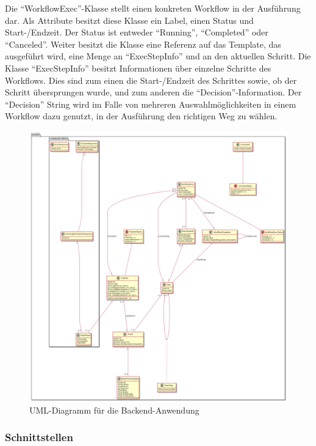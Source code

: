 Die \enquote{WorkflowExec}-Klasse stellt einen konkreten Workflow in der Ausführung dar.
Als Attribute besitzt diese Klasse ein Label, einen Status und Start-/Endzeit.
Der Status ist entweder \enquote{Running}, \enquote{Completed} oder \enquote{Canceled}.
Weiter besitzt die Klasse eine Referenz auf das Template, das ausgeführt wird, eine Menge an \enquote{ExecStepInfo} und an den aktuellen Schritt.
Die Klasse \enquote{ExecStepInfo} besitzt Informationen über einzelne Schritte des Workflows.
Dies sind zum einen die Start-/Endzeit des Schrittes sowie, ob der Schritt übersprungen wurde, und zum anderen die \enquote{Decision}-Information.
Der \enquote{Decision} String wird im Falle von mehreren Auswahlmöglichkeiten in einem Workflow dazu genutzt, in der Ausführung den richtigen Weg zu wählen.

\begin{figure}[h!tbp]
	\includegraphics[width=\textwidth]{images/uml.png}
	\centering
	\caption{UML-Diagramm für die Backend-Anwendung}
	\label{fig:uml}
\end{figure}

\FloatBarrier

\subsubsection{Schnittstellen}

